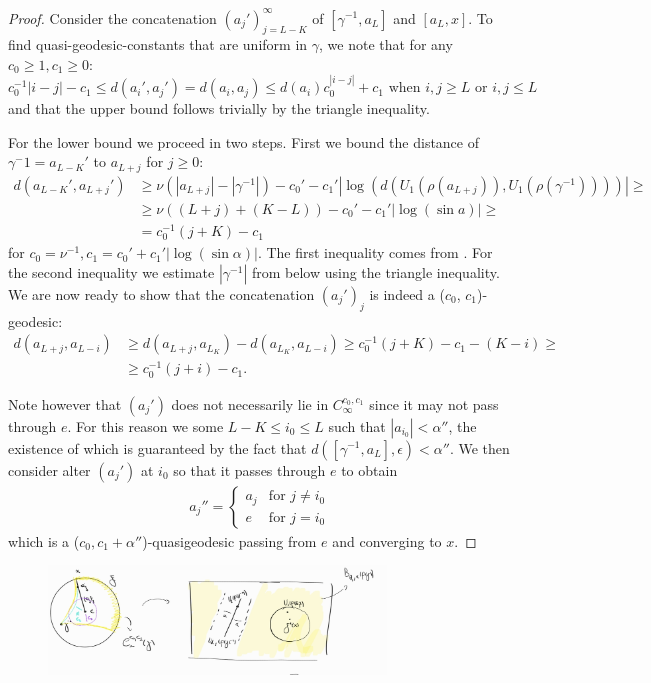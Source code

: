 \documentclass{report}
\begin{document}
\begin{proof}
    Consider the concatenation $(a_j')_{j=L-K}^\infty$ of $[\gamma^{-1},a_L]$ and $[a_L, x]$.
    To find quasi-geodesic-constants that are uniform in $\gamma$, we note that for any $c_0 \geq 1, c_1 \geq 0$:
    \[
        c_0^{-1} |i - j| - c_1 \leq d(a_i', a_j') = d(a_i, a_j) \leq d(a_i) c_0^ |i - j| + c_1 
        \text{ when } i,j \geq L \text{ or } i,j \leq L
    \]
    and that the upper bound follows trivially by the triangle inequality. 
    
    For the lower bound we proceed in two steps. 
    First we bound the distance of $\gamma^-1 = a_{L-K}'$ to $a_{L+j}$ for $j\geq 0$:
    \begin{align*}
        d(a_{L-K}', a_{L+j}') 
        &\geq \nu (|a_{L+j}| - |\gamma^{-1}|) - c_0' -c_1'|\log(d(U_1(\rho(a_{L+j})), U_1(\rho(\gamma^{-1}))))| \geq\\
        &\geq \nu((L+j) + (K-L)) - c_0' -c_1'|\log(\sin a)| \geq\\
        &= c_0^{-1} (j+K) - c_1
    \end{align*}
    for $c_0 = \nu^{-1}, c_1 = c_0' + c_1'|\log(\sin \alpha)|$.
    The first inequality comes from \cite[Lemma 3.9]{pozzetti_anosov_2023}. For the second inequality we estimate $|\gamma^{-1}|$ from below using the triangle inequality.
    We are now ready to show that the concatenation $(a_j')_j$ is indeed a ($c_0$, $c_1$)-geodesic:
    \begin{align*}
        d(a_{L+j}, a_{L-i}) &\geq d(a_{L+j},a_{L_K}) - d(a_{L_K}, a_{L-i}) \geq
        c_0^{-1} (j+K) - c_1 - (K - i) \geq\\
        &\geq c_0^{-1} (j+i) - c_1.
    \end{align*}

    Note however that $(a_j')$ does not necessarily lie in $C_\infty^{c_0, c_1}$ since it may not pass through $e$.
    For this reason we some $L - K \leq i_0\leq L$ such that $|a_{i_0}| < \alpha''$, the existence of which is guaranteed by the fact that $d([\gamma^{-1}, a_L], \epsilon) < \alpha''$.
    We then consider alter $(a_j')$ at $i_0$ so that it passes through $e$ to obtain 
    \begin{align*}
        a_j''=
        \begin{cases}
            a_j & \text{for } j\neq i_0 \\
            e & \text{for } j = i_0
        \end{cases}      
    \end{align*}
    which is a ($c_0, c_1 + \alpha''$)-quasigeodesic passing from $e$ and converging to $x$.
\end{proof}
\begin{figure}[h]
    \centering
    \includegraphics[width=0.8\textwidth]{cone.jpg}
\end{figure}    
\printbibliography
\end{document}
